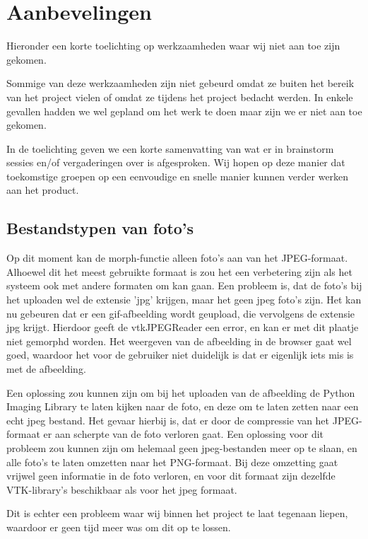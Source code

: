 \section{Aanbevelingen} %
\label{Aanbevelingen}
Hieronder een korte toelichting op werkzaamheden waar wij niet aan toe zijn gekomen. 

Sommige van deze werkzaamheden zijn niet gebeurd omdat ze buiten het bereik van het project vielen of omdat ze tijdens het project bedacht werden. 
In enkele gevallen hadden we wel gepland om het werk te doen maar zijn we er niet aan toe gekomen.  

In de toelichting geven we een korte samenvatting van wat er in brainstorm sessies en/of vergaderingen over is afgesproken. 
Wij hopen op deze manier dat toekomstige groepen op een eenvoudige en snelle manier kunnen verder werken aan het product.

\subsection{Bestandstypen van foto's} %
Op dit moment kan de morph-functie alleen foto's aan van het JPEG-formaat. 
Alhoewel dit het meest gebruikte formaat is zou het een verbetering zijn als het systeem ook met andere formaten om kan gaan. 
Een probleem is, dat de foto's bij het uploaden wel de extensie 'jpg' krijgen, maar het geen jpeg foto's zijn. 
Het kan nu gebeuren dat er een gif-afbeelding wordt geupload, die vervolgens de extensie jpg krijgt. 
Hierdoor geeft de vtkJPEGReader een error, en kan er met dit plaatje niet gemorphd worden. 
Het weergeven van de afbeelding in de browser gaat wel goed, waardoor het voor de gebruiker niet duidelijk is dat er eigenlijk iets mis is met de afbeelding.

Een oplossing zou kunnen zijn om bij het uploaden van de afbeelding de Python Imaging Library te laten kijken naar de foto, en deze om te laten zetten naar een echt jpeg bestand. 
Het gevaar hierbij is, dat er door de compressie van het JPEG-formaat er aan scherpte van de foto verloren gaat.
Een oplossing voor dit probleem zou kunnen zijn om helemaal geen jpeg-bestanden meer op te slaan, en alle foto's te laten omzetten naar het PNG-formaat. Bij deze omzetting gaat vrijwel geen informatie in de foto verloren, en voor dit formaat zijn dezelfde VTK-library's beschikbaar als voor het jpeg formaat.

Dit is echter een probleem waar wij binnen het project te laat tegenaan liepen, waardoor er geen tijd meer was om dit op te lossen.

